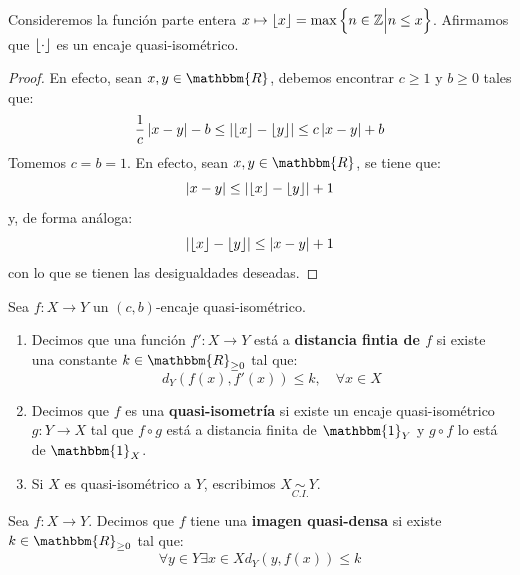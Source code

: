\documentclass[12pt]{report}
\newcounter{it}
\theoremstyle{largebreak}
\newcommand\abs[1]{\ensuremath{\left|#1\right|}}
\newcommand\cf[3]{\ensuremath{#1:#2\rightarrow#3}}
\newcommand{\bbm}[1]{\ensuremath{\mathbbm{#1}}}
\newcommand{\qisom}{\ensuremath{\underset{C.I.}{\sim}}}
\begin{document}
    \begin{exa}
        Consideremos la función parte entera $x\mapsto \lfloor x\rfloor=\max\left\{n\in\mathbb{Z}\Big|n\leq x \right\}$. Afirmamos que $\lfloor \cdot\rfloor$ es un encaje quasi-isométrico.
    \end{exa}

    \begin{proof}
        En efecto, sean $x,y\in\bbm{R}$, debemos encontrar $c\geq1$ y $b\geq0$ tales que:
        \begin{equation*}
            \frac{1}{c}\abs{x-y}-b\leq\abs{\floor{x}-\floor{y}}\leq c\abs{x-y}+b
        \end{equation*}
        Tomemos $c=b=1$. En efecto, sean $x,y\in\bbm{R}$, se tiene que:
        \begin{equation*}
            \abs{x-y}\leq \abs{\floor{x}-\floor{y}}+1
        \end{equation*}
        y, de forma análoga:
        \begin{equation*}
            \abs{\floor{x}-\floor{y}}\leq\abs{x-y}+1
        \end{equation*}
        con lo que se tienen las desigualdades deseadas.
    \end{proof}

    \begin{mydef}
        Sea $\cf{f}{X}{Y}$ un $(c,b)$-encaje quasi-isométrico.
        \begin{enumerate}[label = \textit{(\alph*)}]
            \item Decimos que una función $\cf{f'}{X}{Y}$ está a \textbf{distancia fintia de $f$} si existe una constante $k\in\bbm{R}_{\geq0}$ tal que:
            \begin{equation*}
                d_Y(f(x),f'(x))\leq k,\quad\forall x\in X
            \end{equation*}
            \item Decimos que $f$ es una \textbf{quasi-isometría} si existe un encaje quasi-isométrico $\cf{g}{Y}{X}$ tal que $f\circ g$ está a distancia finita de $\bbm{1}_Y$ y $g\circ f$ lo está de $\bbm{1}_X$.
            \item Si $X$ es quasi-isométrico a $Y$, escribimos $X\qisom Y$.
        \end{enumerate}
    \end{mydef}

    \begin{mydef}
        Sea $\cf{f}{X}{Y}$. Decimos que $f$ tiene una \textbf{imagen quasi-densa} si existe $k\in\bbm{R}_{\geq0}$ tal que:
        \begin{equation*}
            \forall y\in Y \exists x\in X d_Y(y,f(x))\leq k
        \end{equation*}
    \end{mydef}
\end{document}
